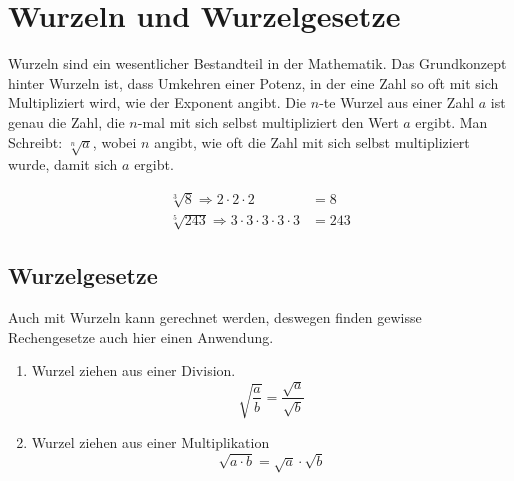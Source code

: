 \section{Wurzeln und Wurzelgesetze}
Wurzeln sind ein wesentlicher Bestandteil in der Mathematik. Das Grundkonzept hinter Wurzeln ist, dass Umkehren einer Potenz, in der eine Zahl so oft mit sich Multipliziert wird, wie der Exponent angibt. Die $n$-te Wurzel aus einer Zahl $a$ ist genau die Zahl, die $n$-mal mit sich selbst multipliziert den Wert $a$ ergibt.
Man Schreibt: $\sqrt[n]{a}$, wobei $n$ angibt, wie oft die Zahl mit sich selbst multipliziert wurde, damit sich $a$ ergibt. 

\begin{beispiel}
	\begin{align}
		\sqrt[3]{8} \Rightarrow 2\cdot 2\cdot 2&=8\\
		\sqrt[5]{243} \Rightarrow 3\cdot 3\cdot 3\cdot 3\cdot 3&=243
	\end{align}
\end{beispiel}
\subsection{Wurzelgesetze} Auch mit Wurzeln kann gerechnet werden, deswegen finden gewisse Rechengesetze auch hier einen Anwendung.
\begin{enumerate}
	\item Wurzel ziehen aus einer Division. \[\sqrt{\frac{a}{b}}=\frac{\sqrt{a}}{\sqrt{b}}\]	
	\item Wurzel ziehen aus einer Multiplikation \[\sqrt{a\cdot b}=\sqrt{a}\cdot \sqrt{b}\]
\end{enumerate}